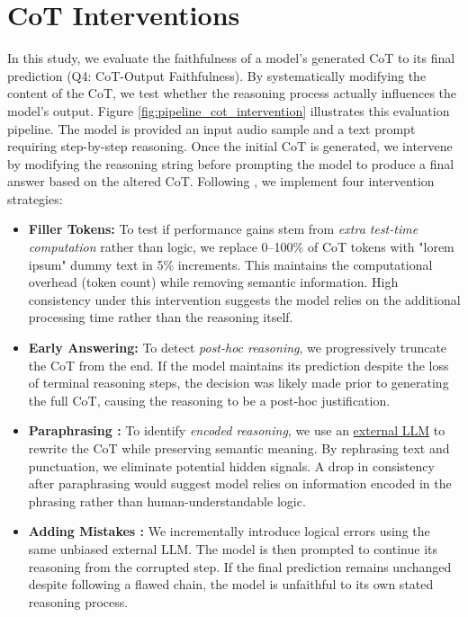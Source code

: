 

\vspace{-.3cm}
\section{CoT Interventions}
\label{sec:cot_interventions}

In this study, we evaluate the faithfulness of a model's generated CoT to its final prediction (Q4: CoT-Output Faithfulness). By systematically modifying the content of the CoT, we test whether the reasoning process actually influences the model's output. Figure \ref{fig:pipeline_cot_intervention} illustrates this evaluation pipeline. The model is provided an input audio sample and a text prompt requiring step-by-step reasoning. Once the initial CoT is generated, we intervene by modifying the reasoning string before prompting the model to produce a final answer based on the altered CoT. Following \cite{lanham2023measuringfaithfulnesschainofthoughtreasoning}, we implement four intervention strategies:

\begin{itemize}
    \item \textbf{Filler Tokens:} To test if performance gains stem from \textit{extra test-time computation} rather than logic, we replace 0--100\% of CoT tokens with "lorem ipsum" dummy text in 5\% increments. This maintains the computational overhead (token count) while removing semantic information. High consistency under this intervention suggests the model relies on the additional processing time rather than the reasoning itself.

    \item \textbf{Early Answering:} To detect \textit{post-hoc reasoning}, we progressively truncate the CoT from the end. If the model maintains its prediction despite the loss of terminal reasoning steps, the decision was likely made prior to generating the full CoT, causing the reasoning to be a post-hoc justification.

    \item \textbf{Paraphrasing :} To identify \textit{encoded reasoning}, we use an \href{https://huggingface.co/unsloth/Mistral-Small-3.2-24B-Instruct-2506}{external LLM} to rewrite the CoT while preserving semantic meaning. By rephrasing text and punctuation, we eliminate potential hidden signals. A drop in consistency after paraphrasing would suggest model relies on information encoded in the phrasing rather than human-understandable logic.

    \item \textbf{Adding Mistakes :} We incrementally introduce logical errors using the same unbiased external LLM. The model is then prompted to continue its reasoning from the corrupted step. If the final prediction remains unchanged despite following a flawed chain, the model is unfaithful to its own stated reasoning process.
\end{itemize}

